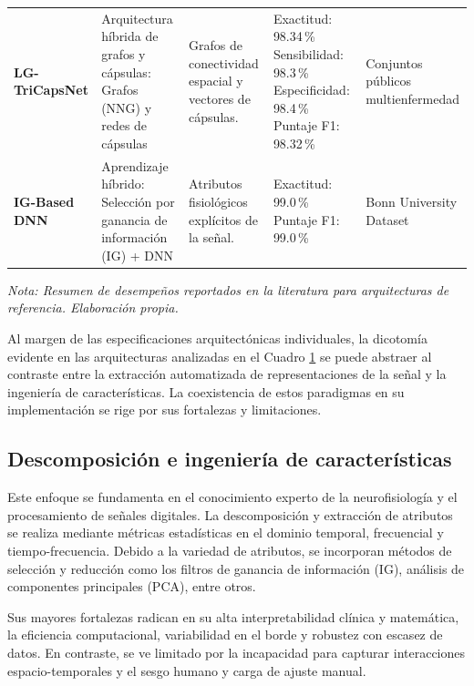\begin{table}[h!]
{\begin{tabular}{p{3cm} | p{3.5cm} p{3.5cm} p{3.5cm} p{2.5cm}}
    \textbf{LG-TriCapsNet}            
    & Arquitectura híbrida de grafos y cápsulas: \newline Grafos (NNG) y redes de cápsulas
    & Grafos de conectividad espacial y vectores de cápsulas.
    & Exactitud: 98.34\,\% \newline Sensibilidad: 98.3\,\% \newline Especificidad: 98.4\,\% \newline Puntaje F1: 98.32\,\%
    & Conjuntos públicos multienfermedad\\
    [1.8ex]
    
    \textbf{IG-Based DNN}            
    & Aprendizaje híbrido: \newline Selección por ganancia de información (IG) + DNN
    & Atributos fisiológicos explícitos de la señal.         
    & Exactitud: 99.0\,\% \newline Puntaje F1: 99.0\,\% 
    & Bonn University Dataset\\ \hline
    \end{tabular}
    }
    
    \vspace{2mm}
    \small \textit{Nota: Resumen de desempeños reportados en la literatura para arquitecturas de referencia. Elaboración propia.}
    \label{tab:matriz_modelos_actuales}  
\end{table}

Al margen de las especificaciones arquitectónicas individuales, la dicotomía evidente en las arquitecturas analizadas en el Cuadro \ref{tab:matriz_modelos_actuales} se puede abstraer al contraste entre la extracción automatizada de representaciones de la señal y la ingeniería de características. La coexistencia de estos paradigmas en su implementación se rige por sus fortalezas y limitaciones.

\subsection{Descomposición e ingeniería de características}
Este enfoque se fundamenta en el conocimiento experto de la neurofisiología y el procesamiento de señales digitales. La descomposición y extracción de atributos se realiza mediante métricas estadísticas en el dominio temporal, frecuencial y tiempo-frecuencia. Debido a la variedad de atributos, se incorporan métodos de selección y reducción como los filtros de ganancia de información (IG), análisis de componentes principales (PCA), entre otros.

Sus mayores fortalezas radican en su alta interpretabilidad clínica y matemática, la eficiencia computacional, variabilidad en el borde y robustez con escasez de datos. En contraste, se ve limitado por la incapacidad para capturar interacciones espacio-temporales y el sesgo humano y carga de ajuste manual.


